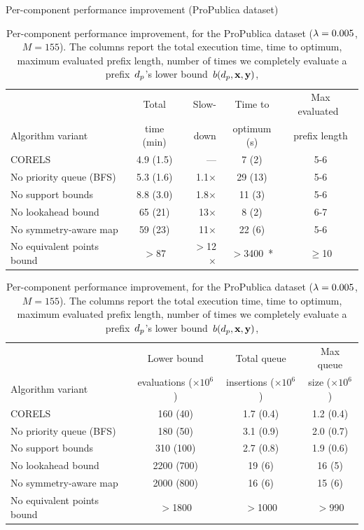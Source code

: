 \begin{table}[t!]
\centering
Per-component performance improvement (ProPublica dataset) \\
\vspace{1mm}
\begin{tabular}{l | c  r | c | c}
& Total & Slow- & Time to & Max evaluated~ \\
Algorithm variant & time (min) & down & optimum (s) & prefix length \\
\hline
CORELS & 4.9 (1.5) & --- & 7 (2) & 5-6 \\
No priority queue (BFS) & 5.3 (1.6) & 1.1$\times$ & 29 (13) & 5-6 \\
No support bounds & 8.8 (3.0) & 1.8$\times$ & 11 (3) & 5-6 \\
No lookahead bound & 65 (21) & 13$\times$ & 8 (2) & 6-7 \\
No symmetry-aware map & 59 (23) & 11$\times$ & 22 (6) & 5-6 \\
No equivalent points bound & $>$87 & $>$12$\times$ & $>$3400~* & $\ge$10 \\
\hline
\end{tabular}
\begin{tabular}{l | c | c | c}
\hline
 & Lower bound & Total queue &  Max queue \\
Algorithm variant & evaluations ($\times 10^6$) & insertions ($\times 10^6$) & size ($\times 10^6$) \\
\hline
CORELS & 160 (40) & 1.7 (0.4) & 1.2 (0.4) \\
No priority queue (BFS) & 180 (50) & 3.1 (0.9) & 2.0 (0.7) \\
No support bounds & 310 (100) & 2.7 (0.8) & 1.9 (0.6) \\
No lookahead bound & 2200 (700) & 19 (6) & 16 (5) \\
No symmetry-aware map & 2000 (800) & 16 (6) & 15 (6) \\
No equivalent points bound & $>$1800 & $>$1000 & $>$990 \\
\end{tabular}
\caption{Per-component performance improvement, for the ProPublica dataset
(${{\lambda} = 0.005}$, ${M = 155}$).
%
The columns report the total execution time,
time to optimum, maximum evaluated prefix length,
number of times we completely evaluate a prefix~$d_p$'s lower bound~$b(d_p, \mathbf{x}, \mathbf{y})$,
}
\end{table}
